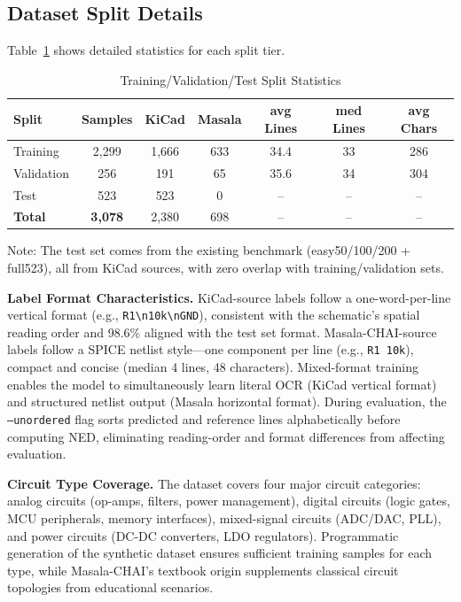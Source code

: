 \subsection{Dataset Split Details}

Table~\ref{tab:split} shows detailed statistics for each split tier.

\begin{table}[h]
\centering
\caption{Training/Validation/Test Split Statistics}
\label{tab:split}
\begin{tabular}{lcccccc}
\toprule
\textbf{Split} & \textbf{Samples} & \textbf{KiCad} & \textbf{Masala} & \textbf{avg Lines} & \textbf{med Lines} & \textbf{avg Chars} \\
\midrule
Training   & 2,299 & 1,666 & 633 & 34.4 & 33 & 286 \\
Validation & 256   & 191  & 65  & 35.6 & 34 & 304 \\
Test       & 523   & 523  & 0   & -- & -- & -- \\
\midrule
\textbf{Total} & \textbf{3,078} & 2,380 & 698 & -- & -- & -- \\
\bottomrule
\end{tabular}
\par\smallskip
{\small\noindent Note: The test set comes from the existing benchmark (easy50/100/200 + full523), all from KiCad sources, with zero overlap with training/validation sets.}
\end{table}

\textbf{Label Format Characteristics.} KiCad-source labels follow a one-word-per-line vertical format (e.g., \texttt{R1\textbackslash n10k\textbackslash nGND}), consistent with the schematic's spatial reading order and 98.6\% aligned with the test set format. Masala-CHAI-source labels follow a SPICE netlist style---one component per line (e.g., \texttt{R1 10k}), compact and concise (median 4 lines, 48 characters). Mixed-format training enables the model to simultaneously learn literal OCR (KiCad vertical format) and structured netlist output (Masala horizontal format). During evaluation, the \texttt{--unordered} flag sorts predicted and reference lines alphabetically before computing NED, eliminating reading-order and format differences from affecting evaluation.

\textbf{Circuit Type Coverage.} The dataset covers four major circuit categories: analog circuits (op-amps, filters, power management), digital circuits (logic gates, MCU peripherals, memory interfaces), mixed-signal circuits (ADC/DAC, PLL), and power circuits (DC-DC converters, LDO regulators). Programmatic generation of the synthetic dataset ensures sufficient training samples for each type, while Masala-CHAI's textbook origin supplements classical circuit topologies from educational scenarios.

